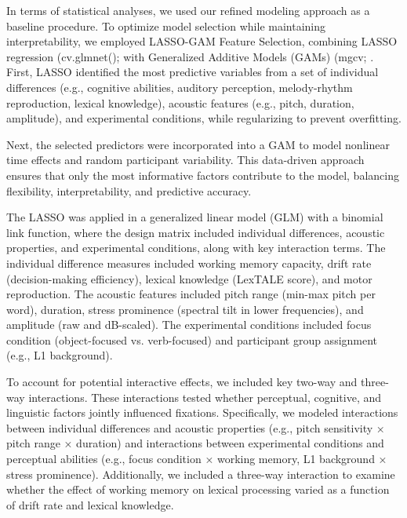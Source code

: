 In terms of statistical analyses, we used our refined modeling approach as a baseline procedure. To optimize model selection while maintaining interpretability, we employed LASSO-GAM Feature Selection, combining LASSO regression (cv.glmnet(); \citep{Friedman2010} with Generalized Additive Models (GAMs) (mgcv; \citep{Wood2017}. First, LASSO identified the most predictive variables from a set of individual differences (e.g., cognitive abilities, auditory perception, melody-rhythm reproduction, lexical knowledge), acoustic features (e.g., pitch, duration, amplitude), and experimental conditions, while regularizing to prevent overfitting.

Next, the selected predictors were incorporated into a GAM to model nonlinear time effects and random participant variability. This data-driven approach ensures that only the most informative factors contribute to the model, balancing flexibility, interpretability, and predictive accuracy.

The LASSO was applied in a generalized linear model (GLM) with a binomial link function, where the design matrix included individual differences, acoustic properties, and experimental conditions, along with key interaction terms. The individual difference measures included working memory capacity, drift rate (decision-making efficiency), lexical knowledge (LexTALE score), and motor reproduction. The acoustic features included pitch range (min-max pitch per word), duration, stress prominence (spectral tilt in lower frequencies), and amplitude (raw and dB-scaled). The experimental conditions included focus condition (object-focused vs. verb-focused) and participant group assignment (e.g., L1 background).

To account for potential interactive effects, we included key two-way and three-way interactions. These interactions tested whether perceptual, cognitive, and linguistic factors jointly influenced fixations. Specifically, we modeled interactions between individual differences and acoustic properties (e.g., pitch sensitivity × pitch range × duration) and interactions between experimental conditions and perceptual abilities (e.g., focus condition × working memory, L1 background × stress prominence). Additionally, we included a three-way interaction to examine whether the effect of working memory on lexical processing varied as a function of drift rate and lexical knowledge.

